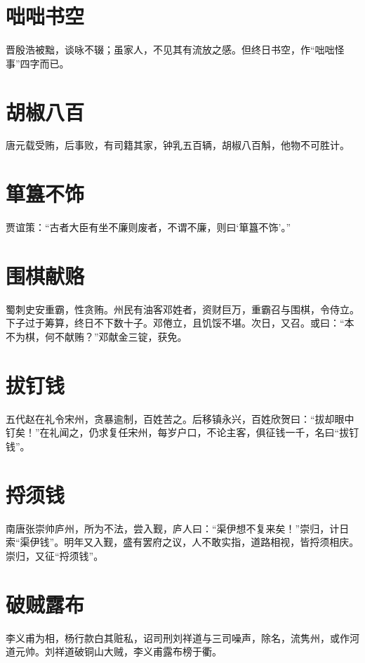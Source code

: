 \documentclass[a4paper,12pt,UTF8,twoside]{ctexbook}
\begin{document}
    \section{咄咄书空}
    
    晋殷浩被黜，谈咏不辍；虽家人，不见其有流放之感。但终日书空，作“咄咄怪事”四字而已。
    
    \section{胡椒八百}
    
    唐元载受贿，后事败，有司籍其家，钟乳五百辆，胡椒八百斛，他物不可胜计。
    
    \section{箪簋不饰}
    
    贾谊策：“古者大臣有坐不廉则废者，不谓不廉，则曰‘箪簋不饰’。”
    
    \section{围棋献赂}
    
    蜀刺史安重霸，性贪贿。州民有油客邓姓者，资财巨万，重霸召与围棋，令侍立。下子过于筹算，终日不下数十子。邓倦立，且饥馁不堪。次日，又召。或曰：“本不为棋，何不献贿？”邓献金三锭，获免。
    
    \section{拔钉钱}
    
    五代赵在礼令宋州，贪暴逾制，百姓苦之。后移镇永兴，百姓欣贺曰：“拔却眼中钉矣！”在礼闻之，仍求复任宋州，每岁户口，不论主客，俱征钱一千，名曰“拔钉钱”。
    
    \section{捋须钱}
    
    南唐张崇帅庐州，所为不法，尝入觐，庐人曰：“渠伊想不复来矣！”崇归，计日索“渠伊钱”。明年又入觐，盛有罢府之议，人不敢实指，道路相视，皆捋须相庆。崇归，又征“捋须钱”。
    
    \section{破贼露布}
    
    李义甫为相，杨行款白其赃私，诏司刑刘祥道与三司噪声，除名，流隽州，或作河道元帅。刘祥道破铜山大贼，李义甫露布榜于衢。
    
\end{document}
